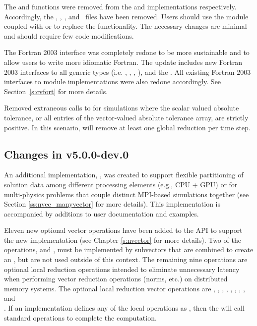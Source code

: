 The  and  functions were removed from the {\nveccuda} and
{\nvecraja} implementations respectively. Accordingly, the ,
, , and~ 
 files have been removed. Users should use
the {\nvecmpiplusx} module coupled with {\nveccuda} or {\nvecraja} to replace the
functionality. The necessary changes are minimal and should require few code
modifications.

The {\cvode} Fortran 2003 interface was completely redone to be more sustainable
and to allow users to write more idiomatic Fortran. The update includes new Fortran
2003 interfaces to all generic {\sundials} types (i.e. {\nvector}, {\sunmatrix},
{\sunlinsol}, {\sunnonlinsol}), and the {\nvecp}. All existing Fortran 2003 interfaces to
{\sundials} module implementations were also redone accordingly. See Section~\ref{s:cvfort}
for more details.

Removed extraneous calls to  for simulations where
the scalar valued absolute tolerance, or all entries of the
vector-valued absolute tolerance array, are strictly positive.  In
this scenario, {\cvode} will remove at least one global reduction per
time step.


\subsection*{Changes in v5.0.0-dev.0}

An additional {\nvector} implementation, {\nvecmanyvector}, was
created to support flexible partitioning of solution data among
different processing elements (e.g., CPU + GPU) or for multi-physics
problems that couple distinct MPI-based simulations together (see
Section \ref{ss:nvec_manyvector} for more details).  This
implementation is accompanied by additions to user documentation and
{\sundials} examples.

Eleven new optional vector operations have been added to the {\nvector} API to
support the new {\nvecmanyvector} implementation (see Chapter \ref{s:nvector}
for more details). Two of the operations,  and
, must be implemented by subvectors that are combined to
create an {\nvecmanyvector}, but are not used outside of this context. The
remaining nine operations are optional local reduction operations intended to
eliminate unnecessary latency when performing vector reduction operations
(norms, etc.) on distributed memory systems. The optional local reduction vector
operations are
,
,
,
,
,
,
,
, and\\
.
If an {\nvector} implementation defines any of the local operations as
, then the {\nvecmanyvector} will call standard {\nvector} operations
to complete the computation.


